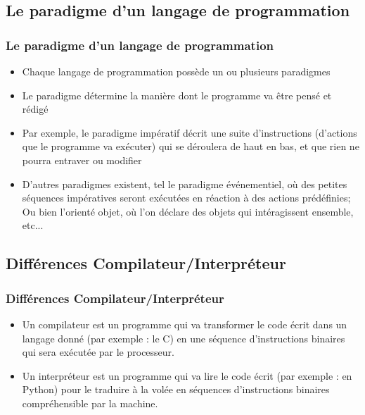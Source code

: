 \documentclass{beamer}
\begin{document}
		\subsection{Le paradigme d'un langage de programmation}
	\begin{frame}
	\frametitle{Le paradigme d'un langage de programmation}
	\begin{itemize}
		\item Chaque langage de programmation possède un ou plusieurs paradigmes
		\pause
		\item Le paradigme détermine la manière dont le programme va être pensé et rédigé
		\pause
		\item Par exemple, le paradigme impératif décrit une suite d'instructions (d'actions que le programme va exécuter) qui se déroulera de haut en bas, et que rien ne pourra entraver ou modifier
		\pause
		\item D'autres paradigmes existent, tel le paradigme événementiel, où des petites séquences impératives seront exécutées en réaction à des actions prédéfinies; Ou bien l'orienté objet, où l'on déclare des objets qui intéragissent ensemble, etc...
	\end{itemize}
	\end{frame}
	
	\subsection{Différences Compilateur/Interpréteur}
	\begin{frame}
	\frametitle{Différences Compilateur/Interpréteur}
	\begin{itemize}
		\item Un compilateur est un programme qui va transformer le code écrit dans un langage donné (par exemple : le C)  en une séquence d'instructions binaires qui sera exécutée par le processeur.
		\pause
		\item Un interpréteur est un programme qui va lire le code écrit (par exemple : en Python) pour le traduire à la volée en séquences d'instructions binaires compréhensible par la machine.
	\end{itemize}
	\end{frame}	
\end{document}
